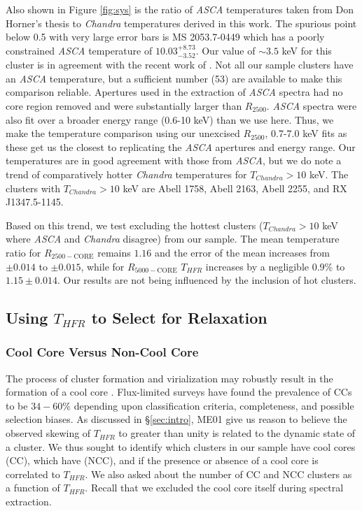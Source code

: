 \documentclass{emulateapj}
\newcommand{\rtwf}{$R_{2500-\text{CORE}}$ }
\newcommand{\rfif}{$R_{5000-\text{CORE}}$ }
\begin{document}
Also shown in Figure \ref{fig:sys} is the ratio of {\it ASCA}
temperatures taken from Don Horner's thesis to {\it Chandra}
temperatures derived in this work. The spurious point below 0.5 with
very large error bars is MS 2053.7-0449 which has a poorly
constrained {\it ASCA} temperature of $10.03^{+8.73}_{-3.52}$. Our value of
$\sim 3.5$ keV for this cluster is in agreement with the recent work of
\cite{2007astro.ph..3156M}. Not all our sample clusters have an {\it ASCA}
temperature, but a sufficient number (53) are available to make this
comparison reliable. Apertures used in the extraction of {\it ASCA} spectra
had no core region removed and were substantially larger than
$R_{2500}$. {\it ASCA} spectra were also fit over a broader energy range
(0.6-10 keV) than we use here. Thus, we make the temperature
comparison using our unexcised $R_{2500}$, 0.7-7.0 keV fits as
these get us the closest to replicating the {\it ASCA} apertures and energy
range. Our temperatures are in good agreement with those from {\it ASCA},
but we do note a trend of comparatively hotter {\it Chandra} temperatures for
$T_{Chandra} > 10$ keV. The clusters with $T_{Chandra} > 10$ keV are
Abell 1758, Abell 2163, Abell 2255, and RX J1347.5-1145.

Based on this trend, we test excluding the hottest clusters
($T_{Chandra} > 10$ keV where {\it ASCA} and {\it Chandra} disagree) from our sample.
The mean temperature ratio for \rtwf remains $1.16$ and the error
of the mean increases from $\pm 0.014$ to $\pm 0.015$, while for \rfif
$T_{HFR}$ increases by a negligible $0.9\%$ to $1.15\pm 0.014$. Our results
are not being influenced by the inclusion of hot clusters.

\subsection{Using $T_{HFR}$ to Select for Relaxation} \label{sec:relax}

\subsubsection{Cool Core Versus Non-Cool Core}\label{sec:ccncc}

The process of cluster formation and virialization may robustly result
in the formation of a cool core
\citep{2006ApJ...640..673O,2007arXiv0708.1954B}. Flux-limited surveys
have found the prevalence of CCs to be $34-60\%$ \citep{1997MNRAS.292..419W,
1998MNRAS.298..416P, 2005MNRAS.359.1481B, 2007A&A...466..805C}
depending upon classification criteria, completeness, and possible
selection biases. As discussed in \S\ref{sec:intro}, ME01 give us
reason to believe the observed skewing of $T_{HFR}$ to greater than unity is
related to the dynamic state of a cluster. We thus sought to identify
which clusters in our sample have cool cores (CC), which have (NCC),
and if the presence or absence of a cool core is correlated to $T_{HFR}$. We
also asked about the number of CC and NCC clusters as a function of
$T_{HFR}$. Recall that we excluded the cool core itself during spectral
extraction.
\end{document}
